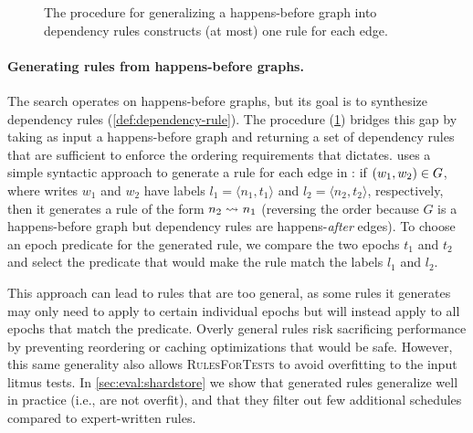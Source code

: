 \begin{figure}
    \centering
    {}
    \caption{The procedure for generalizing a happens-before graph \gr into dependency rules
    constructs (at most) one rule for each edge.}
    \label{fig:alg:rulesforgraph}
\end{figure}

\paragraph{Generating rules from happens-before graphs.}
The  search operates on happens-before graphs,
but its goal is to synthesize dependency rules (\cref{def:dependency-rule}).
The  procedure (\cref{fig:alg:rulesforgraph})
bridges this gap
by taking as input a happens-before graph \gr
and returning a set of dependency rules 
that are sufficient to enforce the ordering requirements that \gr dictates.
 uses a simple syntactic approach to generate a rule for each edge in \gr:
if $(w_1, w_2) \in G$,
where writes $w_1$ and $w_2$ have labels $l_1 = \langle n_1, t_1 \rangle$ and $l_2 = \langle n_2, t_2 \rangle$, respectively,
then it generates a rule of the form $n_2\rightsquigarrow_{}n_1$
(reversing the order because $G$ is a happens-before graph
but dependency rules are happens-\emph{after} edges).
To choose an epoch predicate for the generated rule,
we compare the two epochs $t_1$ and $t_2$
and select the predicate that would make the rule match the labels $l_1$ and $l_2$.\tighten

This approach can lead to rules that are too general,
as some rules it generates may only need to apply to certain individual epochs
but will instead apply to all epochs that match the predicate.
Overly general rules risk sacrificing performance
by preventing reordering or caching optimizations that would be safe.
However, this same generality also allows \textsc{RulesForTests} to avoid overfitting to the input litmus tests.
In \cref{sec:eval:shardstore} we show that generated rules generalize well in practice (i.e., are not overfit),
and that they filter out few additional schedules compared to expert-written rules.


